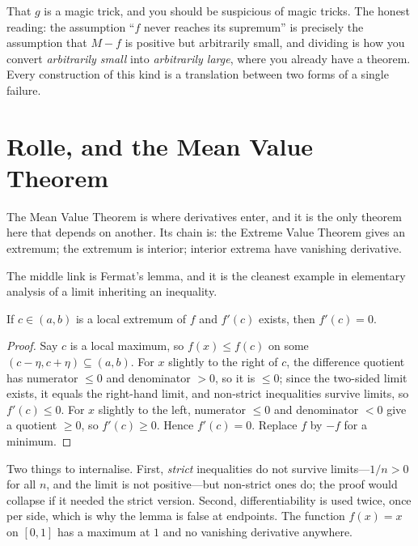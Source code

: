 \documentclass{essay}
\begin{document}
That \(g\) is a magic trick, and you should be suspicious of magic tricks. The honest reading: the assumption ``\(f\) never reaches its supremum'' is precisely the assumption that \(M - f\) is positive but arbitrarily small, and dividing is how you convert \emph{arbitrarily small} into \emph{arbitrarily large}, where you already have a theorem. Every construction of this kind is a translation between two forms of a single failure.

\section{Rolle, and the Mean Value Theorem}

The Mean Value Theorem is where derivatives enter, and it is the only theorem here that depends on another. Its chain is: the Extreme Value Theorem gives an extremum; the extremum is interior; interior extrema have vanishing derivative.

The middle link is Fermat's lemma, and it is the cleanest example in elementary analysis of a limit inheriting an inequality.

\begin{lemma}\label{lem:fermat}
  If \(c \in (a,b)\) is a local extremum of \(f\) and \(f'(c)\) exists, then \(f'(c) = 0\).
\end{lemma}

\begin{proof}
  Say \(c\) is a local maximum, so \(f(x) \leq f(c)\) on some \((c - \eta, c + \eta) \subseteq (a,b)\). For \(x\) slightly to the right of \(c\), the difference quotient has numerator \(\leq 0\) and denominator \(> 0\), so it is \(\leq 0\); since the two-sided limit exists, it equals the right-hand limit, and non-strict inequalities survive limits, so \(f'(c) \leq 0\). For \(x\) slightly to the left, numerator \(\leq 0\) and denominator \(< 0\) give a quotient \(\geq 0\), so \(f'(c) \geq 0\). Hence \(f'(c) = 0\). Replace \(f\) by \(-f\) for a minimum.
\end{proof}

Two things to internalise. First, \emph{strict} inequalities do not survive limits---\(1/n > 0\) for all \(n\), and the limit is not positive---but non-strict ones do; the proof would collapse if it needed the strict version. Second, differentiability is used twice, once per side, which is why the lemma is false at endpoints. The function \(f(x) = x\) on \([0,1]\) has a maximum at \(1\) and no vanishing derivative anywhere.
\end{document}

